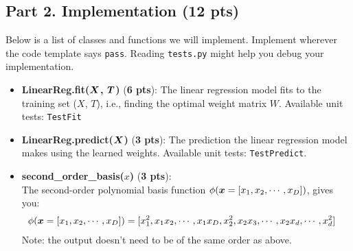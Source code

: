 \vspace{3em}


\subsection*{Part 2. Implementation (12 pts)}
Below is a list of classes and functions we will implement. Implement wherever the code template says \texttt{pass}. Reading \texttt{tests.py} might help you debug your implementation. 

\begin{itemize}
    \item {\bf LinearReg.fit(${\bm{X}}$, ${\bm{T}}$)} ({\bf 6 pts}): The linear regression model fits to the training set ($X$, $T$), i.e., finding the optimal weight matrix $W$. Available unit tests: \texttt{TestFit}
    
    \item {\bf LinearReg.predict(${\bm{X}}$)} ({\bf 3 pts}): The prediction the linear regression model makes using the learned weights. Available unit tests: \texttt{TestPredict}.
    
    \item {\bf second\_order\_basis($x$)} ({\bf 3 pts}): \\
    The second-order polynomial basis function $\phi({\bm{x}} = [x_1, x_2, \cdots, x_D])$, gives you:
    \begin{align*}
        \phi({\bm{x}} = [x_1, x_2, \cdots, x_D]) & = [x_1^2, x_1x_2, \cdots, x_1x_D, x_2^2, x_2x_3, \cdots, x_2x_d, \cdots, x_d^2]
    \end{align*}
    Note: the output doesn't need to be of the same order as above.
    
\end{itemize}


